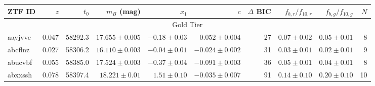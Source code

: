 \documentclass[twocolumn,twocolappendix, linenumbers]{aastex631} %
\begin{document}
\begin{table}[t]
\centering
\begin{tabular}{ |l|r|r|r|r|r|r|r|r|r| } 
  \hline
 
 ZTF ID & $z$ & $t_{0}$ & $m_B$ (mag) & $x_1$ & $c$ & $\Delta$ BIC & $f_{b, r}/f_{10, r}$ & $f_{b, g}/f_{10, g}$ &  $N$\\ 
 \hline
 \multicolumn{10}{|c|}{Gold Tier} \\
 \hline
 
aayjvve & 0.047 & 58292.3 & $17.655 \pm 0.005$ & $-0.18 \pm 0.03$ & $0.052 \pm 0.004$ & 27 & $0.07 \pm 0.02$ & $0.05 \pm 0.01$ & 8 \\
abcflnz & 0.027 & 58306.2 & $16.110 \pm 0.003$ & $-0.04 \pm 0.01$ & $-0.024 \pm 0.002$ & 31 & $0.03 \pm 0.01$ & $0.02 \pm 0.01$ & 9 \\
abucvbf & 0.055 & 58385.0 & $17.524 \pm 0.003$ & $-0.37 \pm 0.04$ & $-0.091 \pm 0.003$ & 36 & $0.05 \pm 0.01$ & $0.04 \pm 0.01$ & 8 \\
abxxssh & 0.078 & 58397.4 & $18.221 \pm 0.01$ & $1.51 \pm 0.10$ & $-0.035 \pm 0.007$ & 91 & $0.14 \pm 0.10$ & $0.20 \pm 0.10$ & 10 \\


\end{tabular}
\end{table}
\end{document}
